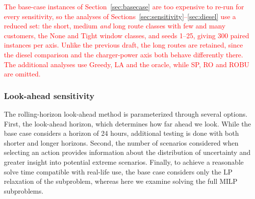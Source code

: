 \documentclass[preprint,12pt,3p]{elsarticle}
\newcommand{\red}[1]{\textcolor{red}{#1}}
\begin{document}
\red{The base-case instances of Section~\ref{sec:basecase} are too expensive to
re-run for every sensitivity, so the analyses of
Sections~\ref{sec:sensitivity}--\ref{sec:diesel} use a reduced set: the short,
medium \emph{and} long route classes with few and many customers, the None and
Tight window classes, and seeds 1--25, giving 300 paired instances per axis.
Unlike the previous draft, the long routes are retained, since the diesel
comparison and the charger-power axis both behave differently there.
The additional analyses use Greedy, LA and the oracle, while SP, RO and ROBU are
omitted.}


\subsubsection{Look-ahead sensitivity}
The rolling-horizon look-ahead method is parameterized through several options. First, the look-ahead horizon, which determines how far ahead we look. While the base case considers a horizon of 24 hours, additional testing is done with both shorter and longer horizons. Second, the number of scenarios considered when selecting an action provides information about the distribution of uncertainty and greater insight into potential extreme scenarios. Finally, to achieve a reasonable solve time compatible with real-life use, the base case considers only the LP relaxation of the subproblem, whereas here we examine solving the full MILP subproblems.
\end{document}
